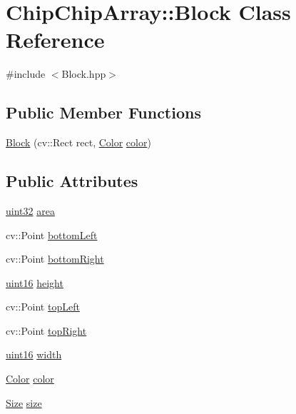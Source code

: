 \hypertarget{classChipChipArray_1_1Block}{\section{Chip\+Chip\+Array\+:\+:Block Class Reference}
\label{classChipChipArray_1_1Block}
}


{\ttfamily \#include $<$Block.\+hpp$>$}

\subsection*{Public Member Functions}
\begin{DoxyCompactItemize}
\item 
\hyperlink{classChipChipArray_1_1Block_a7eb2456e5c95c8a91844c9522eed0578}{Block} (cv\+::\+Rect rect, \hyperlink{definitions_8hpp_abc05a0f46084a3477cf5d5c939ff1436}{Color} \hyperlink{classChipChipArray_1_1Block_a262210a9a04028f3f2670c9ae38ef3d7}{color})
\end{DoxyCompactItemize}
\subsection*{Public Attributes}
\begin{DoxyCompactItemize}
\item 
\hyperlink{definitions_8hpp_a1134b580f8da4de94ca6b1de4d37975e}{uint32} \hyperlink{classChipChipArray_1_1Block_ab5f9a9c1cc11e949685f8ad3d52599b2}{area}
\item 
cv\+::\+Point \hyperlink{classChipChipArray_1_1Block_a78304b597a8d8a74a4d9b4bb561a7224}{bottom\+Left}
\item 
cv\+::\+Point \hyperlink{classChipChipArray_1_1Block_a82f831883d31e6d74be45b8851eefe96}{bottom\+Right}
\item 
\hyperlink{definitions_8hpp_a05f6b0ae8f6a6e135b0e290c25fe0e4e}{uint16} \hyperlink{classChipChipArray_1_1Block_aed94802c166c9b4553764eb637717a2a}{height}
\item 
cv\+::\+Point \hyperlink{classChipChipArray_1_1Block_aeecc05025c6c8e23ff6ca09a6fbd4b4b}{top\+Left}
\item 
cv\+::\+Point \hyperlink{classChipChipArray_1_1Block_aaa4ff82846e95a628800ebdfd3ceefb5}{top\+Right}
\item 
\hyperlink{definitions_8hpp_a05f6b0ae8f6a6e135b0e290c25fe0e4e}{uint16} \hyperlink{classChipChipArray_1_1Block_ac3f815e8aa9060c4ad20d4e1b2649e35}{width}
\item 
\hyperlink{definitions_8hpp_abc05a0f46084a3477cf5d5c939ff1436}{Color} \hyperlink{classChipChipArray_1_1Block_a262210a9a04028f3f2670c9ae38ef3d7}{color}
\item 
\hyperlink{definitions_8hpp_a9809446fd16a744b6df9808293f14153}{Size} \hyperlink{classChipChipArray_1_1Block_aebd356d7fcfe7ff11db8195e6d7f8e42}{size}
\end{DoxyCompactItemize}


